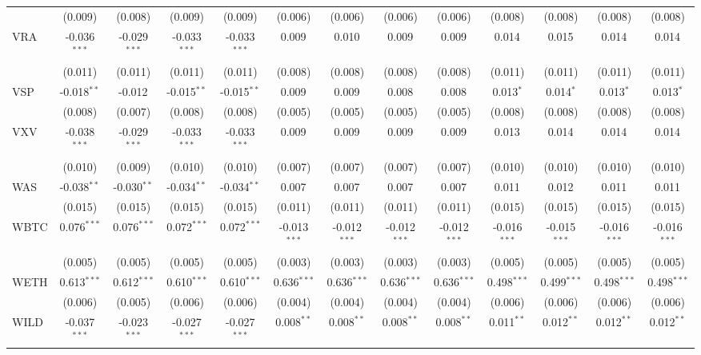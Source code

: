 \begin{table}[!htbp]
\begin{tabular}{@{\extracolsep{5pt}}lcccccccccccc}
  & (0.009) & (0.008) & (0.009) & (0.009) & (0.006) & (0.006) & (0.006) & (0.006) & (0.008) & (0.008) & (0.008) & (0.008) \\
 VRA & -0.036$^{***}$ & -0.029$^{***}$ & -0.033$^{***}$ & -0.033$^{***}$ & 0.009$^{}$ & 0.010$^{}$ & 0.009$^{}$ & 0.009$^{}$ & 0.014$^{}$ & 0.015$^{}$ & 0.014$^{}$ & 0.014$^{}$ \\
  & (0.011) & (0.011) & (0.011) & (0.011) & (0.008) & (0.008) & (0.008) & (0.008) & (0.011) & (0.011) & (0.011) & (0.011) \\
 VSP & -0.018$^{**}$ & -0.012$^{}$ & -0.015$^{**}$ & -0.015$^{**}$ & 0.009$^{}$ & 0.009$^{}$ & 0.008$^{}$ & 0.008$^{}$ & 0.013$^{*}$ & 0.014$^{*}$ & 0.013$^{*}$ & 0.013$^{*}$ \\
  & (0.008) & (0.007) & (0.008) & (0.008) & (0.005) & (0.005) & (0.005) & (0.005) & (0.008) & (0.008) & (0.008) & (0.008) \\
 VXV & -0.038$^{***}$ & -0.029$^{***}$ & -0.033$^{***}$ & -0.033$^{***}$ & 0.009$^{}$ & 0.009$^{}$ & 0.009$^{}$ & 0.009$^{}$ & 0.013$^{}$ & 0.014$^{}$ & 0.014$^{}$ & 0.014$^{}$ \\
  & (0.010) & (0.009) & (0.010) & (0.010) & (0.007) & (0.007) & (0.007) & (0.007) & (0.010) & (0.010) & (0.010) & (0.010) \\
 WAS & -0.038$^{**}$ & -0.030$^{**}$ & -0.034$^{**}$ & -0.034$^{**}$ & 0.007$^{}$ & 0.007$^{}$ & 0.007$^{}$ & 0.007$^{}$ & 0.011$^{}$ & 0.012$^{}$ & 0.011$^{}$ & 0.011$^{}$ \\
  & (0.015) & (0.015) & (0.015) & (0.015) & (0.011) & (0.011) & (0.011) & (0.011) & (0.015) & (0.015) & (0.015) & (0.015) \\
 WBTC & 0.076$^{***}$ & 0.076$^{***}$ & 0.072$^{***}$ & 0.072$^{***}$ & -0.013$^{***}$ & -0.012$^{***}$ & -0.012$^{***}$ & -0.012$^{***}$ & -0.016$^{***}$ & -0.015$^{***}$ & -0.016$^{***}$ & -0.016$^{***}$ \\
  & (0.005) & (0.005) & (0.005) & (0.005) & (0.003) & (0.003) & (0.003) & (0.003) & (0.005) & (0.005) & (0.005) & (0.005) \\
 WETH & 0.613$^{***}$ & 0.612$^{***}$ & 0.610$^{***}$ & 0.610$^{***}$ & 0.636$^{***}$ & 0.636$^{***}$ & 0.636$^{***}$ & 0.636$^{***}$ & 0.498$^{***}$ & 0.499$^{***}$ & 0.498$^{***}$ & 0.498$^{***}$ \\
  & (0.006) & (0.005) & (0.006) & (0.006) & (0.004) & (0.004) & (0.004) & (0.004) & (0.006) & (0.006) & (0.006) & (0.006) \\
 WILD & -0.037$^{***}$ & -0.023$^{***}$ & -0.027$^{***}$ & -0.027$^{***}$ & 0.008$^{**}$ & 0.008$^{**}$ & 0.008$^{**}$ & 0.008$^{**}$ & 0.011$^{**}$ & 0.012$^{**}$ & 0.012$^{**}$ & 0.012$^{**}$ \\

\end{tabular}
\end{table}
